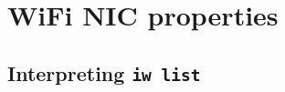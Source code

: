 \documentclass[../wifi-security.tex]{subfiles}
\begin{document}
\chapter{WiFi NIC properties}

\section*{Interpreting \texttt{iw list}}



\end{document}
